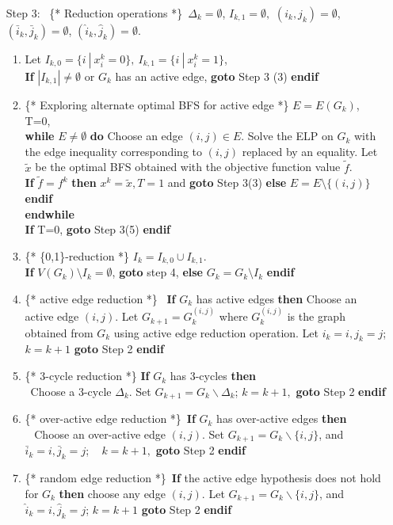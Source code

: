 \documentclass[12pt]{article}
\begin{document}
\begin{itemize}
\item[Step 3:~] \{* \textsf{Reduction operations}
*\}\ $\Delta_k=\emptyset$, $I_{k,1}=\emptyset,$ $(i_k,j_k)=\emptyset$, $(\bar{i}_k, \bar{j}_k)=\emptyset$, $(\hat{i}_k, \hat{j}_k)=\emptyset$.
\begin{enumerate}
\item Let $I_{k,0}=\{i\ | \ x_i^k=0\}, \ I_{k,1}=\{ i\ | \
x_i^k=1\}$,\\\textbf{If} $|I_{k,1}|\neq \emptyset$ or $G_k$ has an
active edge, \textbf{goto} Step 3 (3) \textbf{endif}
 \item \{*
\textsf{Exploring alternate optimal BFS for active edge} *\}
$E= E(G_k)$, T=0,\\
\textbf{while} $E\neq \emptyset$ \textbf{do}
Choose an edge $(i,j)\in E$.
Solve the ELP on $G_k$ with the edge inequality corresponding to
$(i,j)$ replaced by an equality. Let $\tilde{x}$ be the optimal
BFS obtained with the objective function value $\tilde{f}$.\\
\textbf{If} $\tilde{f}=f^k$ \textbf{then} $x^k=\tilde{x}, T=1$ and \textbf{goto} Step 3(3)
\textbf{else} $E=E\setminus \{(i,j)\}$ \textbf{endif} \\ \textbf{endwhile}\\
\textbf{If} T=0, \textbf{goto} Step 3(5) \textbf{endif}\item \{*
\textsf{\{0,1\}-reduction} *\}  $I_k=I_{k,0}\cup I_{k,1}$.\\
\textbf{If} $V(G_k)\setminus I_{k}=\emptyset$, \textbf{goto}
step 4, \textbf{else}  $G_k=G_k\setminus I_k$ \textbf{endif}
\item \{* \textsf{active edge reduction} *\}  \ \textbf{If} $G_k$ has active edges \textbf{then} Choose an active
edge $(i,j)$. Let $G_{k+1}=G_k^{(i,j)}$ where $G_k^{(i,j)}$ is the
graph obtained from $G_k$ using  active edge reduction operation.
Let $i_k=i, j_k=j$; $k=k+1$ \textbf{goto} Step 2 \textbf{endif}
\item \{* \textsf{3-cycle reduction} *\} \textbf{If} $G_k$ has 3-cycles \textbf{then} \\
     \mbox{ }Choose a 3-cycle $\Delta_k$. Set $G_{k+1}=G_k\backslash \Delta_k$;
     $k=k+1,$ \textbf{goto} Step 2 \textbf{endif}
\item \{* \textsf{over-active edge reduction} *\}\ \textbf{If} $G_k$ has over-active edges \textbf{then} \\
     \mbox{ } Choose an over-active edge $(i, j)$. Set $G_{k+1}=G_k\backslash \{i,j\}$, and $\bar{i}_k=i, \bar{j}_k=j$;
     \mbox{ } $k=k+1,$ \textbf{goto} Step 2 \textbf{endif}
\item \{* \textsf{random edge reduction} *\}\ \textbf{If} the active
edge hypothesis does not hold for $G_k$ \textbf{then} choose
any edge $(i,j)$.
Let $G_{k+1}=G_k\backslash \{i,j\}$, and $\hat{i}_k=i, \hat{j}_k=j$; $k=k+1$ \textbf{goto} Step 2 \textbf{endif}
\end{enumerate}
\end{itemize}
\end{document}
